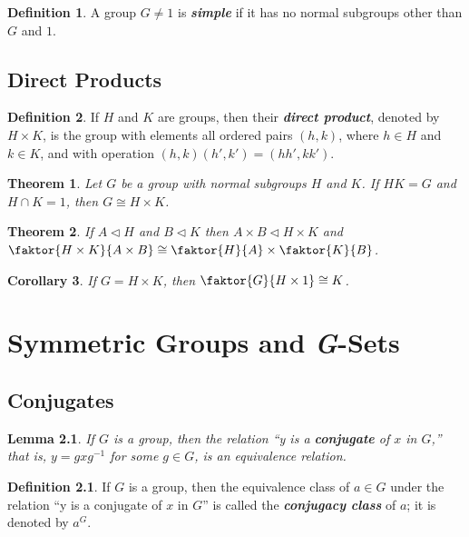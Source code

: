 \documentclass[12pt]{report}
\newtheorem{theorem}{Theorem}[chapter]
\newtheorem{corollary}[theorem]{Corollary}
\newtheorem{lemma}[theorem]{Lemma}
\theoremstyle{definition}
\newtheorem*{definition}{Definition}
\newcommand{\term}[1]{\textbf{\textit{#1}}}
\begin{document}
\begin{definition}
	A group $G\neq1$ is \term{simple} if it has no normal subgroups other than $G$ and $1$.
\end{definition}



\section{Direct Products}

\begin{definition}
	If $H$ and $K$ are groups, then their \term{direct product}, denoted by $H\times K$, is the group with elements all
	ordered pairs $(h, k)$, where $h\in H$ and $k\in K$, and with operation $(h, k)(h', k')=(hh', kk')$.
\end{definition}

\begin{theorem}
	Let $G$ be a group with normal subgroups $H$ and $K$. If $HK=G$ and $H\cap K=1$, then $G\cong H\times K$.
\end{theorem}

\begin{theorem}
	If $A\vartriangleleft H$ and $B\vartriangleleft K$ then $A\times B\vartriangleleft H\times K$ and
	$\faktor{H\times K}{A\times B}\cong\faktor{H}{A}\times\faktor{K}{B}$.
\end{theorem}

\begin{corollary}
	If $G=H\times K$, then $\faktor{G}{H\times1}\cong K$.
\end{corollary}


\chapter{Symmetric Groups and \textit{G}-Sets}

\section{Conjugates}
\begin{lemma}
	If $G$ is a group, then the relation “y is a \term{conjugate} of $x$ in $G$,” that is, $y=gxg^{-1}$ for some $g\in G$, is an equivalence relation.
\end{lemma}

\begin{definition}
	If $G$ is a group, then the equivalence class of $a\in G$ under the relation “y is a conjugate of $x$ in $G$” is called the \term{conjugacy class} of $a$; it is denoted by $a^G$.
\end{definition}
\end{document}
